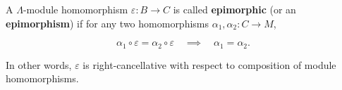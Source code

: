 A $\Lambda$-module homomorphism $\varepsilon : B \rightarrow C$ is called \textbf{epimorphic} (or an \textbf{epimorphism}) if for any two homomorphisms $\alpha_1, \alpha_2 : C \rightarrow M$,

$$\alpha_1 \circ \varepsilon = \alpha_2 \circ \varepsilon \quad \implies \quad \alpha_1 = \alpha_2.$$

In other words, $\varepsilon$ is right-cancellative with respect to composition of module homomorphisms.
